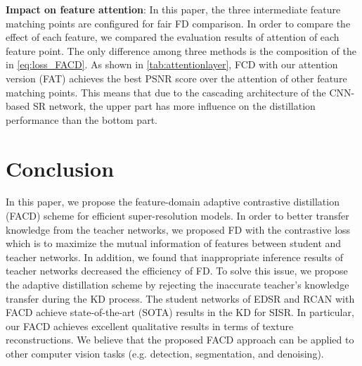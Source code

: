 \documentclass[10pt,twocolumn,letterpaper]{article}
\begin{document}
\noindent \textbf{Impact on feature attention}: In this paper, the three intermediate feature matching points are configured for fair FD comparison. In order to compare the effect of each feature, we compared the evaluation results of attention of each feature point. The only difference among three methods is the composition of the  in \cref{eq:loss_FACD}. As shown in \cref{tab:attentionlayer}, FCD with our attention version (FAT) achieves the best PSNR score over the attention of other feature matching points. This means that due to the cascading architecture of the CNN-based SR network, the upper part has more influence on the distillation performance than the bottom part.

\begin{table}[h]
\centering
\caption{Ablation study (PSNR) of the feature attention on EDSR x2. FAA, FAB, and FAT indicate paying attention to the average, bottom, and top parts of features matching points, respectively. FAU is the version of this paper. The better performance is marked in \textbf{bold}.}


\label{tab:attentionlayer}
\end{table}
\section{Conclusion}
In this paper, we propose the feature-domain adaptive contrastive distillation (FACD) scheme for efficient super-resolution models. In order to better transfer knowledge from the teacher networks, we proposed FD with the contrastive loss which is to maximize the mutual information of features between student and teacher networks. In addition, we found that inappropriate inference results of teacher networks decreased the efficiency of FD. To solve this issue, we propose the adaptive distillation scheme by rejecting the inaccurate teacher's knowledge transfer during the KD process. The student networks of EDSR and RCAN with FACD achieve state-of-the-art (SOTA) results in the KD for SISR. In particular, our FACD achieves excellent qualitative results in terms of texture reconstructions. We believe that the proposed FACD approach can be applied to other computer vision tasks (e.g. detection, segmentation, and denoising).





{\small


}
\end{document}
